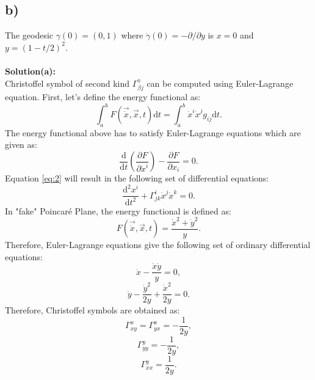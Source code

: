 \documentclass[11pt]{amsart}
\begin{document}
\subsection*{b)}
The geodesic $\gamma(0)=(0,1)$ where $\dot{\gamma}(0)=-\partial/\partial y$ is $x=0$ and $y=(1-t/2)^2$.
\\
\\
\textbf{Solution(a):}\\
Christoffel  symbol of second kind $\Gamma_{\beta j}^{\gamma}$ can be computed using Euler-Lagrange equation. First, let's define the energy functional as:
\begin{equation}
\label{eq:1}
\int_{a}^{b}F(\vec{\dot{x}},\vec{x},t)\mathrm{d}t=\int_{a}^{b}\dot{x}^{i}\dot{x}^{j}g_{ij}\mathrm{d}t.
\end{equation}
The energy functional above has to satisfy Euler-Lagrange equations which are given as:
\begin{equation}
\label{eq:2}
\frac{\mathrm{d}}{\mathrm{d} t}(\frac{\partial F}{\partial \dot{x}^i})-\frac{\partial F}{\partial x_i}=0.
\end{equation}
Equation \ref{eq:2}  will result in the following set of differential equations:
\begin{equation}
\label{eq:3}
\frac{\mathrm{d}^2 x^i}{\mathrm{d} t^2}+\Gamma_{j k}^{i}\dot{x}^j \dot{x}^k =0.
\end{equation}
In "fake" Poincar\'{e} Plane, the energy functional is defined as:
\begin{equation}
\label{eq:4}
F(\vec{\dot{x}},\vec{x},t)=\frac{\dot{x}^2+\dot{y}^2}{y}.
\end{equation}
Therefore, Euler-Lagrange equations give the following set of ordinary differential equations:
\begin{equation}
\label{eq:5}
\ddot{x}-\frac{\dot{x}\dot{y}}{y}=0,
\end{equation}
\begin{equation}
\label{eq:6}
\ddot{y}-\frac{\dot{y}^2}{2y}+\frac{\dot{x}^2}{2y}=0.
\end{equation}
Therefore, Christoffel symbols are obtained as:
\begin{equation}
\Gamma_{x y}^{x}=\Gamma_{y x}^{x}=-\frac{1}{2y},
\end{equation}
\begin{equation}
\Gamma_{y y}^{y}=-\frac{1}{2y},
\end{equation}
\begin{equation}
\Gamma_{x x}^{y}=\frac{1}{2y}.
\end{equation}
\end{document}
